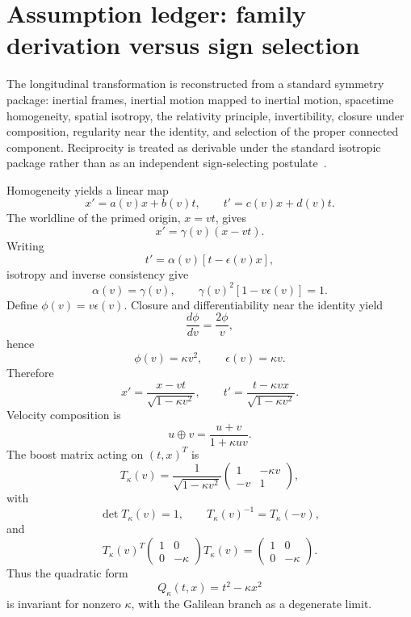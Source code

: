 \documentclass[11pt,a4paper]{article}
\newcommand{\kap}{\kappa}
\begin{document}
\section{Assumption ledger: family derivation versus sign selection}
The longitudinal transformation is reconstructed from a standard symmetry package: inertial frames, inertial motion mapped to inertial motion, spacetime homogeneity, spatial isotropy, the relativity principle, invertibility, closure under composition, regularity near the identity, and selection of the proper connected component.  Reciprocity is treated as derivable under the standard isotropic package rather than as an independent sign-selecting postulate~\cite{berzi1969,pelissetto2015,drory2015}.

Homogeneity yields a linear map
\[
x'=a(v)x+b(v)t,\qquad t'=c(v)x+d(v)t.
\]
The worldline of the primed origin, $x=vt$, gives
\[
x'=\gamma(v)(x-vt).
\]
Writing
\[
t'=\alpha(v)[t-\epsilon(v)x],
\]
isotropy and inverse consistency give
\[
\alpha(v)=\gamma(v),\qquad
\gamma(v)^2[1-v\epsilon(v)]=1.
\]
Define $\phi(v)=v\epsilon(v)$.  Closure and differentiability near the identity yield
\[
\frac{d\phi}{dv}=\frac{2\phi}{v},
\]
hence
\[
\phi(v)=\kap v^2,\qquad \epsilon(v)=\kap v.
\]
Therefore
\begin{equation}
\boxed{x'=\frac{x-vt}{\sqrt{1-\kap v^2}}},\qquad
\boxed{t'=\frac{t-\kap vx}{\sqrt{1-\kap v^2}}}.
\label{eq:boost}
\end{equation}
Velocity composition is
\begin{equation}
\boxed{u\oplus v=\frac{u+v}{1+\kap uv}}.
\label{eq:addition}
\end{equation}
The boost matrix acting on $(t,x)^T$ is
\begin{equation}
T_\kap(v)=\frac{1}{\sqrt{1-\kap v^2}}
\begin{pmatrix}1&-\kap v\\-v&1\end{pmatrix},
\end{equation}
with
\[
\det T_\kap(v)=1,\qquad T_\kap(v)^{-1}=T_\kap(-v),
\]
and
\begin{equation}
T_\kap(v)^T
\begin{pmatrix}1&0\\0&-\kap\end{pmatrix}
T_\kap(v)=
\begin{pmatrix}1&0\\0&-\kap\end{pmatrix}.
\label{eq:invariant}
\end{equation}
Thus the quadratic form
\begin{equation}
Q_\kap(t,x)=t^2-\kap x^2
\end{equation}
is invariant for nonzero $\kap$, with the Galilean branch as a degenerate limit.
\end{document}
